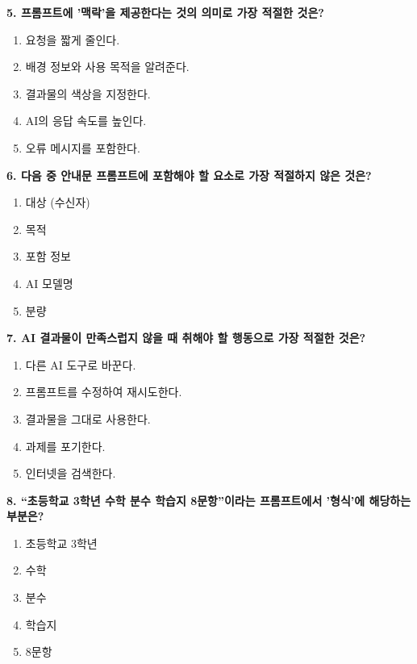 \documentclass[11pt,a4paper]{article}
\begin{document}
\vspace{5mm}

\textbf{5. 프롬프트에 '맥락'을 제공한다는 것의 의미로 가장 적절한 것은?}

\begin{enumerate}[label=\textcircled{\small\arabic*}]
  \item 요청을 짧게 줄인다.
  \item 배경 정보와 사용 목적을 알려준다.
  \item 결과물의 색상을 지정한다.
  \item AI의 응답 속도를 높인다.
  \item 오류 메시지를 포함한다.
\end{enumerate}

\newpage

\textbf{6. 다음 중 안내문 프롬프트에 포함해야 할 요소로 가장 적절하지 않은 것은?}

\begin{enumerate}[label=\textcircled{\small\arabic*}]
  \item 대상 (수신자)
  \item 목적
  \item 포함 정보
  \item AI 모델명
  \item 분량
\end{enumerate}

\vspace{5mm}

\textbf{7. AI 결과물이 만족스럽지 않을 때 취해야 할 행동으로 가장 적절한 것은?}

\begin{enumerate}[label=\textcircled{\small\arabic*}]
  \item 다른 AI 도구로 바꾼다.
  \item 프롬프트를 수정하여 재시도한다.
  \item 결과물을 그대로 사용한다.
  \item 과제를 포기한다.
  \item 인터넷을 검색한다.
\end{enumerate}

\vspace{5mm}

\textbf{8. ``초등학교 3학년 수학 분수 학습지 8문항''이라는 프롬프트에서 '형식'에 해당하는 부분은?}

\begin{enumerate}[label=\textcircled{\small\arabic*}]
  \item 초등학교 3학년
  \item 수학
  \item 분수
  \item 학습지
  \item 8문항
\end{enumerate}
\end{document}
